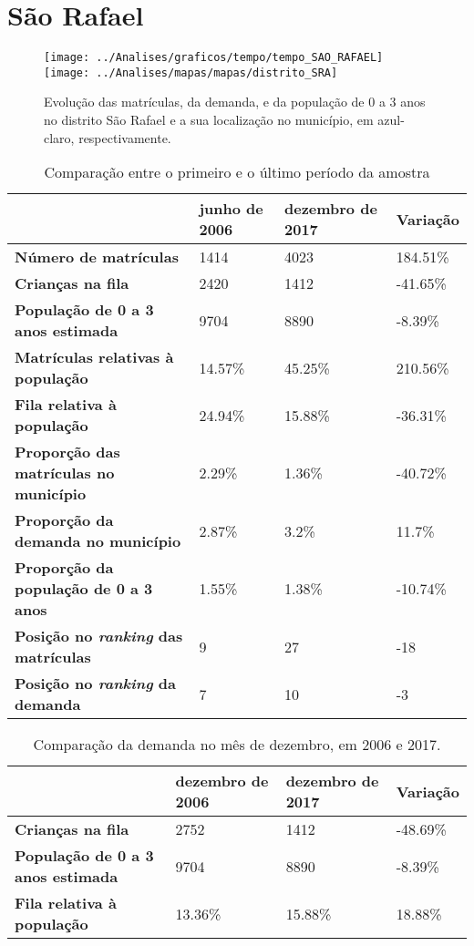 \section{São Rafael}
\begin{figure}[H]
\centering
\texttt{[image: ../Analises/graficos/tempo/tempo\_SAO\_RAFAEL]}
\texttt{[image: ../Analises/mapas/mapas/distrito\_SRA]}
\caption{Evolução das matrículas, da demanda, e da população de 0 a 3 anos no distrito São Rafael e a sua localização no município, em azul-claro, respectivamente.}
\end{figure}
\begin{table}[H]
\begin{tabular}{l|l|l|l}
\textbf{}                                      & \textbf{junho de 2006}       & \textbf{dezembro de 2017}    & \textbf{Variação} \\ \hline
\textbf{Número de matrículas}                  & 1414 & 4023 & 184.51\% \\ \hline
\textbf{Crianças na fila}                      & 2420 & 1412 & -41.65\% \\ \hline
\textbf{População de 0 a 3 anos estimada}      & 9704 & 8890 & -8.39\% \\ \hline
\textbf{Matrículas relativas à população}      & 14.57\% & 45.25\% & 210.56\% \\ \hline
\textbf{Fila relativa à população}             & 24.94\% & 15.88\% & -36.31\% \\ \hline
\textbf{Proporção das matrículas no município} & 2.29\% & 1.36\% & -40.72\% \\ \hline
\textbf{Proporção da demanda no município}     & 2.87\% & 3.2\% & 11.7\% \\ \hline
\textbf{Proporção da população de 0 a 3 anos}  & 1.55\% & 1.38\% & -10.74\% \\ \hline
\textbf{Posição no \textit{ranking} das matrículas}     & 9 & 27 & -18 \\ \hline
\textbf{Posição no \textit{ranking} da demanda}         & 7 & 10 & -3 \\ 
\end{tabular}
\caption{Comparação entre o primeiro e o último período da amostra}
\end{table}
\begin{table}[H]
\begin{tabular}{l|l|l|l}
\textbf{}                                 & \textbf{dezembro de 2006} & \textbf{dezembro de 2017} & \textbf{Variação} \\ \hline
\textbf{Crianças na fila}                      & 2752 & 1412 & -48.69\% \\ \hline
\textbf{População de 0 a 3 anos estimada}      & 9704 & 8890 & -8.39\% \\ \hline
\textbf{Fila relativa à população}             & 13.36\% & 15.88\% & 18.88\% \\
\end{tabular}
\caption{Comparação da demanda no mês de dezembro, em 2006 e 2017.}
\end{table}

